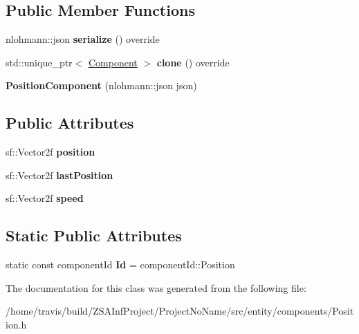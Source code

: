 \subsection*{Public Member Functions}
\begin{DoxyCompactItemize}
\item 
\hypertarget{classPositionComponent_a9a84bd0289a2172af56ccfb3a81a2ec6}{nlohmann\-::json {\bfseries serialize} () override}\label{classPositionComponent_a9a84bd0289a2172af56ccfb3a81a2ec6}

\item 
\hypertarget{classPositionComponent_ae04209639f07bee7be1fef2731262851}{std\-::unique\-\_\-ptr$<$ \hyperlink{classComponent}{Component} $>$ {\bfseries clone} () override}\label{classPositionComponent_ae04209639f07bee7be1fef2731262851}

\item 
\hypertarget{classPositionComponent_ab884ac96dc85424de2adb3423a76cc95}{{\bfseries Position\-Component} (nlohmann\-::json json)}\label{classPositionComponent_ab884ac96dc85424de2adb3423a76cc95}

\end{DoxyCompactItemize}
\subsection*{Public Attributes}
\begin{DoxyCompactItemize}
\item 
\hypertarget{classPositionComponent_a98149921fa43d0c82e6a79a3b96cbfef}{sf\-::\-Vector2f {\bfseries position}}\label{classPositionComponent_a98149921fa43d0c82e6a79a3b96cbfef}

\item 
\hypertarget{classPositionComponent_ada7eda72ac5839af96457c6764a468c7}{sf\-::\-Vector2f {\bfseries last\-Position}}\label{classPositionComponent_ada7eda72ac5839af96457c6764a468c7}

\item 
\hypertarget{classPositionComponent_aa9ce8cff0358ee1befbf9695aa3d7ab4}{sf\-::\-Vector2f {\bfseries speed}}\label{classPositionComponent_aa9ce8cff0358ee1befbf9695aa3d7ab4}

\end{DoxyCompactItemize}
\subsection*{Static Public Attributes}
\begin{DoxyCompactItemize}
\item 
\hypertarget{classPositionComponent_a8eb32e3b88cfbd10e1837baed9ba71c6}{static const component\-Id {\bfseries Id} = component\-Id\-::\-Position}\label{classPositionComponent_a8eb32e3b88cfbd10e1837baed9ba71c6}

\end{DoxyCompactItemize}


The documentation for this class was generated from the following file\-:\begin{DoxyCompactItemize}
\item 
/home/travis/build/\-Z\-S\-A\-Inf\-Project/\-Project\-No\-Name/src/entity/components/Position.\-h\end{DoxyCompactItemize}

